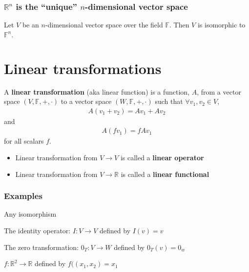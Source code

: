 \documentclass[compress]{beamer}
\def\F{\mathbb{F}}
\def\R{\mathbb{R}}
\theoremstyle{definition}
\begin{document}
\begin{frame}\frametitle{$\R^n$ is the ``unique'' $n$-dimensional
    vector space}
  \begin{theorem}
    Let $V$ be an $n$-dimensional vector space over the field $\F$. Then
    $V$ is isomorphic to $\F^n$. 
  \end{theorem}
\end{frame}

\section{Linear transformations}

\begin{frame}
  \begin{definition}
    A \textbf{linear transformation} (aka linear function) is a
    function, $A$, from a vector space $(V,\F,+,\cdot)$ to a vector
    space $(W,\F,+,\cdot)$ such that $\forall v_1, v_2 \in V$,
    \begin{align*}
      A (v_1 + v_2) = A v_1 + A v_2 
    \end{align*}
    and 
    \begin{align*}
      A (f v_1) = f A v_1
    \end{align*}
    for all scalars $f$.   
    \begin{itemize}
    \item Linear transformation from $V \to V$ is called a \textbf{linear
        operator}
    \item Linear transformation from $V \to \R$ is called a
      \textbf{linear functional}
    \end{itemize}
  \end{definition}
\end{frame}

\begin{frame}
  \frametitle{Examples}
  \begin{example}
    Any isomorphism
  \end{example}
  
  \begin{example}
    The identity operator: $I:V \to V$ defined by $I(v) = v$
  \end{example}

  \begin{example}
    The zero transformation: $0_T:V \to W$ defined by $0_T(v) = 0_w$
  \end{example}

  \begin{example}
    $f:\R^2 \to \R$ defined by $f((x_1,x_2) = x_1$
  \end{example}
\end{frame}
\end{document}
